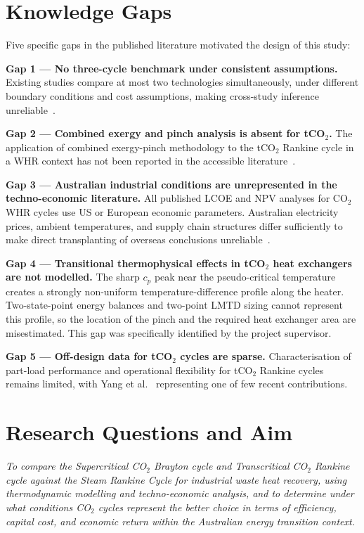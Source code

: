 \section{Knowledge Gaps}
\label{sec:knowledge_gap}

Five specific gaps in the published literature motivated the design of this
study:

\bigskip
\noindent\textbf{Gap 1 --- No three-cycle benchmark under consistent assumptions.}
Existing studies compare at most two technologies simultaneously, under
different boundary conditions and cost assumptions, making cross-study
inference unreliable~\cite{Jiang2023,Kizilkan2020,Baglietto2023}.

\bigskip
\noindent\textbf{Gap 2 --- Combined exergy and pinch analysis is absent for tCO$_2$.}
The application of combined exergy-pinch methodology to the tCO$_2$ Rankine
cycle in a WHR context has not been reported in the accessible
literature~\cite{Sarkar2009,Nami2017}.

\bigskip
\noindent\textbf{Gap 3 --- Australian industrial conditions are unrepresented
in the techno-economic literature.}
All published LCOE and NPV analyses for CO$_2$ WHR cycles use US or European
economic parameters. Australian electricity prices, ambient temperatures, and
supply chain structures differ sufficiently to make direct transplanting of
overseas conclusions unreliable~\cite{Papapetrou2018,ARENA2023}.

\bigskip
\noindent\textbf{Gap 4 --- Transitional thermophysical effects in tCO$_2$ heat
exchangers are not modelled.}
The sharp $c_p$ peak near the pseudo-critical temperature creates a strongly
non-uniform temperature-difference profile along the heater. Two-state-point
energy balances and two-point LMTD sizing cannot represent this profile, so
the location of the pinch and the required heat exchanger area are
misestimated. This gap was specifically identified by the project supervisor.

\bigskip
\noindent\textbf{Gap 5 --- Off-design data for tCO$_2$ cycles are sparse.}
Characterisation of part-load performance and operational flexibility for
tCO$_2$ Rankine cycles remains limited, with Yang et al.~\cite{Yang2024}
representing one of few recent contributions.

\section{Research Questions and Aim}
\label{sec:rqs}

\begin{mdframed}[linecolor=uqpurple,linewidth=1.5pt,
  backgroundcolor=uqpurple!5,roundcorner=4pt,
  innerleftmargin=12pt,innerrightmargin=12pt,
  innertopmargin=10pt,innerbottommargin=10pt]
\textit{To compare the Supercritical CO$_2$ Brayton cycle and Transcritical
CO$_2$ Rankine cycle against the Steam Rankine Cycle for industrial waste heat
recovery, using thermodynamic modelling and techno-economic analysis, and to
determine under what conditions CO$_2$ cycles represent the better choice in
terms of efficiency, capital cost, and economic return within the Australian
energy transition context.}
\end{mdframed}

